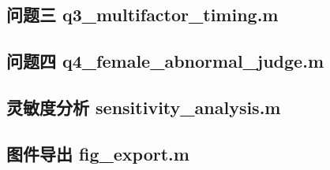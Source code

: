 \documentclass[UTF8,zihao=-4]{ctexart}
\numberwithin{equation}{section}
\begin{document}
\subsection{问题三 q3\_multifactor\_timing.m}

\subsection{问题四 q4\_female\_abnormal\_judge.m}

\subsection{灵敏度分析 sensitivity\_analysis.m}

\subsection{图件导出 fig\_export.m}
\end{document}
